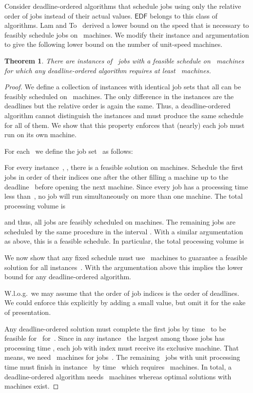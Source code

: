 \documentclass[letterpaper,11pt]{article}
\newtheorem{theorem}{Theorem}
\newcommand{\EDF}{\ensuremath{\mathsf{EDF}}\xspace}
\begin{document}
Consider deadline-ordered algorithms that schedule jobs using only the relative order of jobs instead of their actual values. \EDF belongs to this class of algorithms. Lam and To~\cite{lamT99} derived a lower bound on the speed that is necessary to feasibly schedule jobs on~ machines. We modify their instance and argumentation to give the following lower bound on the number of unit-speed machines.

\begin{theorem}\label{thm:deadline-ordered}
  There are instances of~ jobs with a feasible schedule on~ machines for which any deadline-ordered algorithm requires at least~ machines.
\end{theorem}

\begin{proof}
We define a collection of instances with identical job sets that all can be feasibly scheduled on~ machines. The only difference in the instances are the deadlines but the relative order is again the same. Thus, a deadline-ordered algorithm cannot distinguish the instances and must produce the same schedule for all of them. We show that this property enforces that (nearly) each job must run on its own machine.

For each~ we define the job set~ as follows:


For every instance~, , there is a feasible solution on  machines. Schedule the first  jobs in order of their indices one after the other filling a machine up to the deadline~ before opening the next machine. Since every job has a processing time less than~, no job will run simultaneously on more than one machine. The total processing volume is 

and thus, all jobs are feasibly scheduled on  machines. The remaining jobs are scheduled by the same procedure in the interval . With a similar argumentation as above, this is a feasible schedule. In particular, the total processing volume is


We now show that any fixed schedule  must use~ machines to guarantee a feasible solution for all instances~. With the argumentation above this implies the lower bound for any deadline-ordered algorithm. 

W.l.o.g.~we may assume that the order of job indices is the order of deadlines. We could enforce this explicitly by adding a small value, but omit it for the sake of presentation. 

Any deadline-ordered solution must complete the first  jobs by time~ to be feasible for~ for~. Since in any instance~ the largest among those jobs has processing time , each job with index  must receive its exclusive machine. That means, we need~ machines for jobs~. The remaining~ jobs with unit processing time must finish in instance~ by time~ which requires~ machines. In total, a deadline-ordered algorithm needs~ machines whereas optimal solutions with~ machines exist.
\end{proof}
\end{document}
